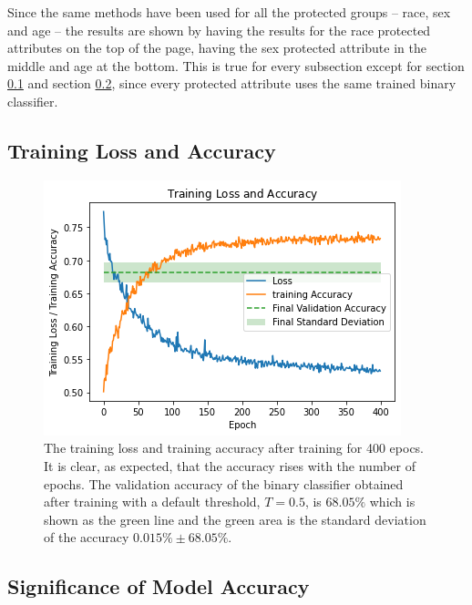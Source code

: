 \documentclass[11pt, fleqn, titlepage]{article}
\begin{document}
	Since the same methods have been used for all the protected groups -- race, sex and age -- the results are shown by having the results for the race protected attributes on the top of the page, having the sex protected attribute in the middle and age at the bottom. This is true for every subsection except for section \ref{training_loss_and_accuracy} and section \ref{modelAccuracy}, since every protected attribute uses the same trained binary classifier.
	
	\subsection{Training Loss and Accuracy}\label{training_loss_and_accuracy}
	
	\begin{figure}[H]
			\centering
			\includegraphics[width=0.5\linewidth]{imgs/loss_curve.png}
		\caption{The training loss and training accuracy after training for 400 epocs. It is clear, as expected, that the accuracy rises with the number of epochs. The validation accuracy of the binary classifier obtained after training with a default threshold, $ T=0.5 $, is $ 68.05\%$ which is shown as the green line and the green area is the standard deviation of the accuracy $0.015\% \pm 68.05\%$.%
		}
		\label{fig:losscurve}
	\end{figure}
	
	\subsection{Significance of Model Accuracy}\label{modelAccuracy}
	
\end{document}
